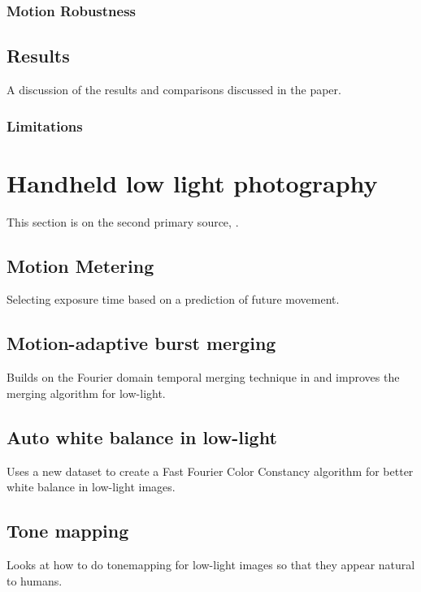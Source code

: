 \documentclass{sig-alternate}
\begin{document}
\subsubsection{Motion Robustness}

\subsection{Results}

A discussion of the results and comparisons discussed in the paper.

\subsubsection{Limitations}

\section{Handheld low light photography}

This section is on the second primary source, \cite{Liba2019}.

\subsection{Motion Metering}

Selecting exposure time based on a prediction of future movement.

\subsection{Motion-adaptive burst merging}

Builds on the Fourier domain temporal merging technique in \cite{Hasinoff2016} and improves the merging algorithm for low-light.

\subsection{Auto white balance in low-light}

Uses a new dataset to create a Fast Fourier Color Constancy algorithm for better white balance in low-light images.

\subsection{Tone mapping}

Looks at how to do tonemapping for low-light images so that they appear natural to humans.
\end{document}

